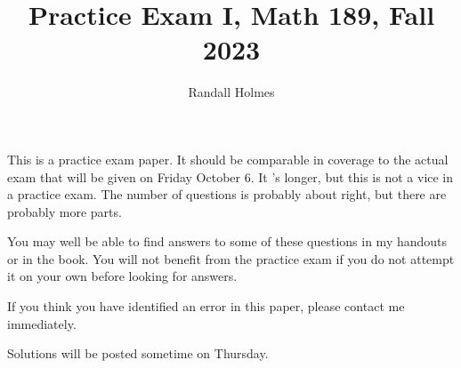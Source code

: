 \documentclass[12pt]{article}
\title{Practice Exam I, Math 189, Fall 2023}
\author{Randall Holmes}
\begin{document}
\maketitle

This is a practice exam paper.  It should be comparable in coverage to the actual exam that will be given on Friday October 6.  It 's longer, but this is not a vice in a practice exam.  The number of questions is probably about right, but there are probably more parts.

You may well be able to find answers to some of these questions in my handouts or in the book.  You will not benefit from the practice exam if you do not attempt it on your own before looking for answers.

If you think you have identified an error in this paper, please contact me immediately.

Solutions will be posted sometime on Thursday.

\newpage
\end{document}
